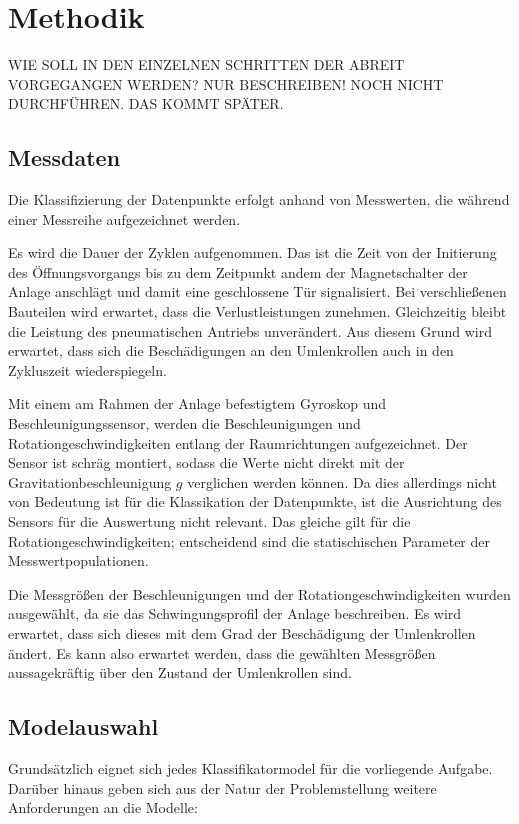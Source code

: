 \chapter{Methodik}
\label{ch:methodik}

WIE SOLL IN DEN EINZELNEN SCHRITTEN DER ABREIT VORGEGANGEN WERDEN? NUR BESCHREIBEN! NOCH NICHT DURCHFÜHREN. DAS KOMMT SPÄTER.

\section{Messdaten}
\label{sec:messdaten}
Die Klassifizierung der Datenpunkte erfolgt anhand von Messwerten, die während einer Messreihe aufgezeichnet werden. 

Es wird die Dauer der Zyklen aufgenommen. Das ist die Zeit von der Initierung des Öffnungsvorgangs bis zu dem Zeitpunkt andem der Magnetschalter der Anlage anschlägt und damit eine geschlossene Tür signalisiert. Bei verschließenen Bauteilen wird erwartet, dass die Verlustleistungen zunehmen. Gleichzeitig bleibt die Leistung des pneumatischen Antriebs unverändert. Aus diesem Grund wird erwartet, dass sich die Beschädigungen an den Umlenkrollen auch in den Zykluszeit wiederspiegeln.

Mit einem am Rahmen der Anlage befestigtem Gyroskop und Beschleunigungssensor, werden die Beschleunigungen und Rotationgeschwindigkeiten entlang der Raumrichtungen aufgezeichnet. Der Sensor ist schräg montiert, sodass die Werte nicht direkt mit der Gravitationbeschleunigung $g$ verglichen werden können. Da dies allerdings nicht von Bedeutung ist für die Klassikation der Datenpunkte, ist die Ausrichtung des Sensors für die Auswertung nicht relevant. 
Das gleiche gilt für die Rotationgeschwindigkeiten; entscheidend sind die statischischen Parameter der Messwertpopulationen.

Die Messgrößen der Beschleunigungen und der Rotationgeschwindigkeiten wurden ausgewählt, da sie das Schwingungsprofil der Anlage beschreiben. Es wird erwartet, dass sich dieses mit dem Grad der Beschädigung der Umlenkrollen ändert. Es kann also erwartet werden, dass die gewählten Messgrößen aussagekräftig über den Zustand der Umlenkrollen sind.

\section{Modelauswahl}
\label{sec:modelauswahl}

Grundsätzlich eignet sich jedes Klassifikatormodel für die vorliegende Aufgabe. Darüber hinaus geben sich aus der Natur der Problemstellung weitere Anforderungen an die Modelle:

